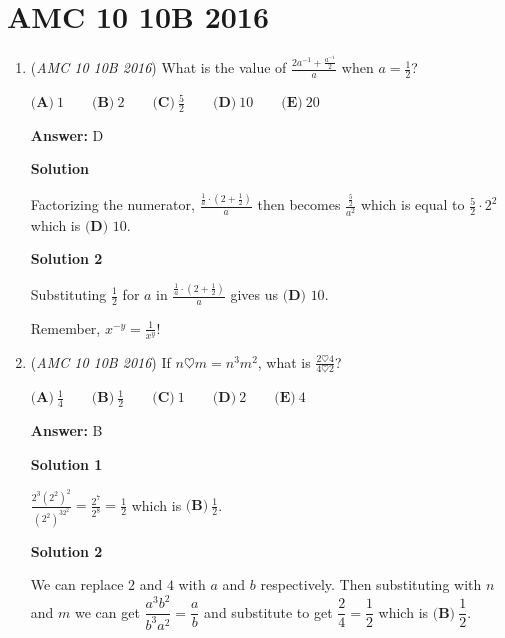 \section{AMC 10 10B 2016}
        \begin{enumerate}
        	\item (\textit{AMC 10 10B 2016}) What is the value of $\frac{2a^{-1}+\frac{a^{-1}}{2}}{a}$ when $a= \frac{1}{2}$?


 $\textbf{(A)}\ 1\qquad\textbf{(B)}\ 2\qquad\textbf{(C)}\ \frac{5}{2}\qquad\textbf{(D)}\ 10\qquad\textbf{(E)}\ 20$

 \textbf{Answer: }D



\textbf{Solution}

Factorizing the numerator, $\frac{\frac{1}{a}\cdot(2+\frac{1}{2})}{a}$ then becomes $\frac{\frac{5}{2}}{a^{2}}$ which is equal to $\frac{5}{2}\cdot 2^2$ which is $\boxed{\textbf{(D) }10}$.

 



\textbf{Solution 2}

Substituting $\frac{1}{2}$ for $a$ in $\frac{\frac{1}{a}\cdot(2+\frac{1}{2})}{a}$ gives us $\boxed{\textbf{(D) }10}$.

 Remember, $x^{-y}=\frac{1}{x^y}$!

 


 


	\item (\textit{AMC 10 10B 2016}) If $n\heartsuit m=n^3m^2$, what is $\frac{2\heartsuit 4}{4\heartsuit 2}$?


 $\textbf{(A)}\ \frac{1}{4}\qquad\textbf{(B)}\ \frac{1}{2}\qquad\textbf{(C)}\ 1\qquad\textbf{(D)}\ 2\qquad\textbf{(E)}\ 4$

 \textbf{Answer: }B



\textbf{Solution 1}

$\frac{2^3(2^2)^2}{(2^2)^32^2}=\frac{2^7}{2^8}=\frac12$ which is $\boxed{\textbf{(B)} ~ \frac{1}{2}}$.

 



\textbf{Solution 2}

We can replace $2$ and $4$ with $a$ and $b$ respectively. Then substituting with $n$ and $m$ we can get $\dfrac{a^3b^2}{b^3a^2}=\dfrac{a}{b}$ and substitute to get $\dfrac{2}{4}=\dfrac{1}{2}$ which is $\boxed{\textbf{(B)} ~ \dfrac{1}{2}}$.


\end{enumerate}
